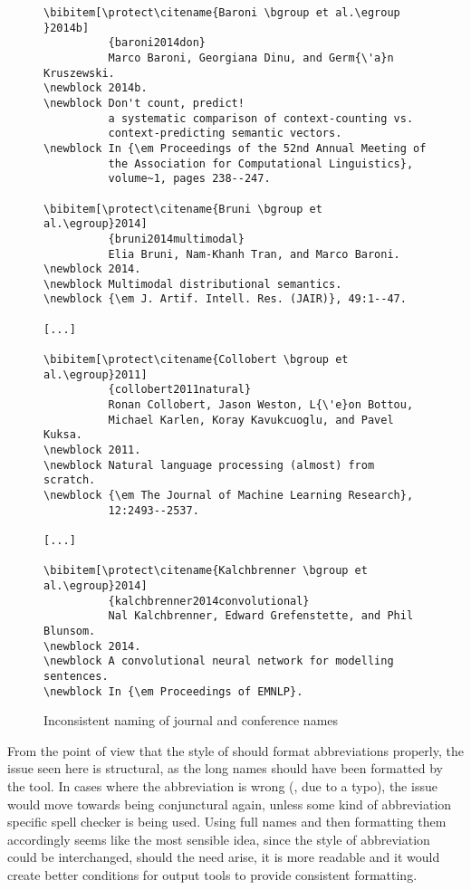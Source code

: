 \begin{figure}
  \centering
\begin{small}
\begin{verbatim}
\bibitem[\protect\citename{Baroni \bgroup et al.\egroup }2014b]
          {baroni2014don}
          Marco Baroni, Georgiana Dinu, and Germ{\'a}n Kruszewski.
\newblock 2014b.
\newblock Don't count, predict!
          a systematic comparison of context-counting vs.
          context-predicting semantic vectors.
\newblock In {\em Proceedings of the 52nd Annual Meeting of
          the Association for Computational Linguistics},
          volume~1, pages 238--247.

\bibitem[\protect\citename{Bruni \bgroup et al.\egroup}2014]
          {bruni2014multimodal}
          Elia Bruni, Nam-Khanh Tran, and Marco Baroni.
\newblock 2014.
\newblock Multimodal distributional semantics.
\newblock {\em J. Artif. Intell. Res. (JAIR)}, 49:1--47.

[...]

\bibitem[\protect\citename{Collobert \bgroup et al.\egroup}2011]
          {collobert2011natural}
          Ronan Collobert, Jason Weston, L{\'e}on Bottou,
          Michael Karlen, Koray Kavukcuoglu, and Pavel Kuksa.
\newblock 2011.
\newblock Natural language processing (almost) from scratch.
\newblock {\em The Journal of Machine Learning Research},
          12:2493--2537.

[...]

\bibitem[\protect\citename{Kalchbrenner \bgroup et al.\egroup}2014]
          {kalchbrenner2014convolutional}
          Nal Kalchbrenner, Edward Grefenstette, and Phil Blunsom.
\newblock 2014.
\newblock A convolutional neural network for modelling sentences.
\newblock In {\em Proceedings of EMNLP}.
\end{verbatim}
\end{small}
  \caption{Inconsistent naming of journal and conference names}
\label{fig:inconsistent_naming}
\end{figure}

From the point of view that the style of {\bibtex} should format
abbreviations properly, the issue seen here is structural, as the long
names should have been formatted by the tool.  In cases where the
abbreviation is wrong (\eg, due to a typo), the issue would move
towards being conjunctural again, unless some kind of abbreviation
specific spell checker is being used.  Using full names and then
formatting them accordingly seems like the most sensible idea, since
the style of abbreviation could be interchanged, should the need
arise, it is more readable and it would create better conditions for
output tools to provide consistent formatting.

